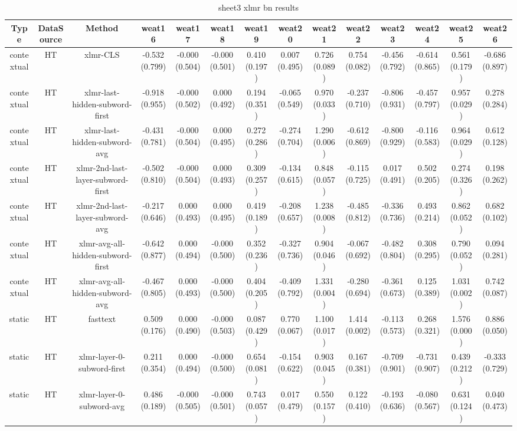 \begin{sidewaystable}[htb]
    \centering
    \caption{sheet3 xlmr bn results}
    \label{appendix_tab:sheet3_xlmr_bn_results}
    \small
    \begin{tabular}{@{}cccccccccccccc@{}}
        \toprule
        Type & DataSource & Method & weat16 & weat17 & weat18 & weat19 & weat20 & weat21 & weat22 & weat23 & weat24 & weat25 & weat26 \\
        \midrule
        contextual & HT & xlmr-CLS & -0.532 (0.799) & -0.000 (0.504) & -0.000 (0.501) & 0.410 (0.197) & 0.007 (0.495) & 0.726 (0.089) & 0.754 (0.082) & -0.456 (0.792) & -0.614 (0.865) & 0.561 (0.179) & -0.686 (0.897) \\
        contextual & HT & xlmr-last-hidden-subword-first & -0.918 (0.955) & -0.000 (0.502) & 0.000 (0.492) & 0.194 (0.351) & -0.065 (0.549) & 0.970 (0.033) & -0.237 (0.710) & -0.806 (0.931) & -0.457 (0.797) & 0.957 (0.029) & 0.278 (0.284) \\
        contextual & HT & xlmr-last-hidden-subword-avg & -0.431 (0.781) & -0.000 (0.504) & 0.000 (0.495) & 0.272 (0.286) & -0.274 (0.704) & 1.290 (0.006) & -0.612 (0.869) & -0.800 (0.929) & -0.116 (0.583) & 0.964 (0.029) & 0.612 (0.128) \\
        contextual & HT & xlmr-2nd-last-layer-subword-first & -0.502 (0.810) & -0.000 (0.504) & 0.000 (0.493) & 0.309 (0.257) & -0.134 (0.615) & 0.848 (0.057) & -0.115 (0.725) & 0.017 (0.491) & 0.502 (0.205) & 0.274 (0.326) & 0.198 (0.262) \\
        contextual & HT & xlmr-2nd-last-layer-subword-avg & -0.217 (0.646) & 0.000 (0.493) & 0.000 (0.495) & 0.419 (0.189) & -0.208 (0.657) & 1.238 (0.008) & -0.485 (0.812) & -0.336 (0.736) & 0.493 (0.214) & 0.862 (0.052) & 0.682 (0.102) \\
        contextual & HT & xlmr-avg-all-hidden-subword-first & -0.642 (0.877) & 0.000 (0.494) & -0.000 (0.500) & 0.352 (0.236) & -0.327 (0.736) & 0.904 (0.046) & -0.067 (0.692) & -0.482 (0.804) & 0.308 (0.295) & 0.790 (0.052) & 0.094 (0.281) \\
        contextual & HT & xlmr-avg-all-hidden-subword-avg & -0.467 (0.805) & 0.000 (0.493) & -0.000 (0.500) & 0.404 (0.205) & -0.409 (0.792) & 1.331 (0.004) & -0.280 (0.694) & -0.361 (0.673) & 0.125 (0.389) & 1.031 (0.002) & 0.742 (0.087) \\
        static & HT & fasttext & 0.509 (0.176) & 0.000 (0.490) & -0.000 (0.503) & 0.087 (0.429) & 0.770 (0.067) & 1.100 (0.017) & 1.414 (0.002) & -0.113 (0.573) & 0.268 (0.321) & 1.576 (0.000) & 0.886 (0.050) \\
        static & HT & xlmr-layer-0-subword-first & 0.211 (0.354) & 0.000 (0.494) & -0.000 (0.500) & 0.654 (0.081) & -0.154 (0.622) & 0.903 (0.045) & 0.167 (0.381) & -0.709 (0.901) & -0.731 (0.907) & 0.439 (0.212) & -0.333 (0.729) \\
        static & HT & xlmr-layer-0-subword-avg & 0.486 (0.189) & -0.000 (0.505) & -0.000 (0.501) & 0.743 (0.057) & 0.017 (0.479) & 0.550 (0.157) & 0.122 (0.410) & -0.193 (0.636) & -0.080 (0.567) & 0.631 (0.124) & 0.040 (0.473) \\
        \bottomrule
    \end{tabular}
\end{sidewaystable}